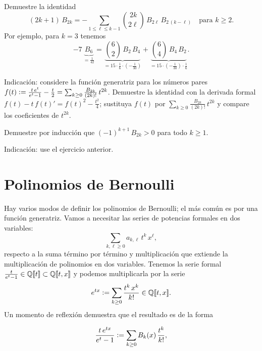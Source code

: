 \documentclass{article}
\begin{document}
\begin{ejercicio*}[Euler]
Demuestre la identidad
$$(2k + 1)\,B_{2k} = -\sum_{1 \le \ell \le k-1} {2k \choose 2\ell}\,B_{2\ell}\,B_{2\,(k-\ell)} \quad \text{para }k\ge 2.$$
Por ejemplo, para $k = 3$ tenemos
$$-7\,\underbrace{B_6}_{= \frac{1}{42}} = \underbrace{{6 \choose 2}\,B_2\,B_4}_{= 15\cdot \frac{1}{6}\cdot\left(-\frac{1}{30}\right)} + \underbrace{{6 \choose 4}\,B_4\,B_2}_{= 15\cdot\left(-\frac{1}{30}\right)\cdot \frac{1}{6}}.$$

\vspace{1em}

\noindent Indicación: considere la función generatriz para los números pares $f (t) \mathrel{\mathop:}= \frac{t\,e^t}{e^t - 1} - \frac{t}{2} = \sum_{k \ge 0} \frac{B_{2k}}{(2k)!}\,t^{2k}$. Demuestre la identidad con la derivada formal $f (t) - t\,f(t)' = f(t)^2 - \frac{t^2}{4}$; sustituya $f (t)$ por $\sum_{k \ge 0} \frac{B_{2k}}{(2k)!}\,t^{2k}$ y compare los coeficientes de $t^{2k}$.
\end{ejercicio*}

\begin{ejercicio*}
Demuestre por inducción que $(-1)^{k+1}\,B_{2k} > 0$ para todo $k \ge 1$.

\noindent Indicación: use el ejercicio anterior.
\end{ejercicio*}


\section*{Polinomios de Bernoulli}

Hay varios modos de definir los polinomios de Bernoulli; el más común es por una función generatriz. Vamos a necesitar las series de potencias formales en dos variables:
$$\sum_{k, \ell \ge 0} a_{k,\ell} \, t^k \, x^\ell,$$
respecto a la suma término por término y multiplicación que extiende la multiplicación de polinomios en dos variables. Tenemos la serie formal $\frac{t}{e^t - 1} \in \mathbb{Q} [\![t]\!] \subset \mathbb{Q} [\![t,x]\!]$ y podemos multiplicarla por la serie
$$e^{tx} \mathrel{\mathop:}= \sum_{k \ge 0} \frac{t^k\,x^k}{k!} \in \mathbb{Q} [\![t,x]\!].$$
Un momento de reflexión demuestra que el resultado es de la forma

\begin{equation}
\label{polinomios-de-Bernoulli-por-una-funcion-generatriz}
\frac{t\,e^{tx}}{e^t-1} \mathrel{\mathop:}= \sum_{k \ge 0} B_k (x)\,\frac{t^k}{k!},
\end{equation}
\end{document}
